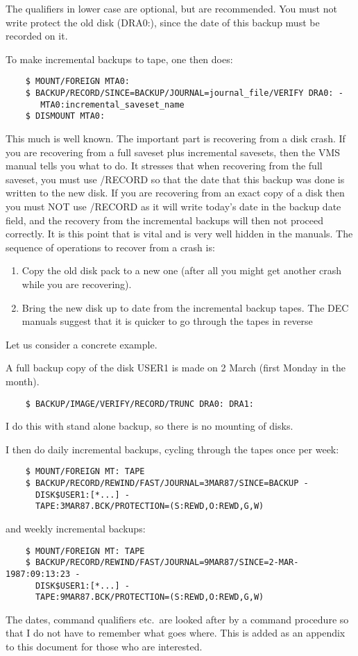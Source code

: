 The qualifiers in lower case are optional, but are recommended.
You must not write protect the old disk (DRA0:), since the date of this
backup must be recorded on it.

To make incremental backups to tape, one then does:
\begin{verbatim}
    $ MOUNT/FOREIGN MTA0: 
    $ BACKUP/RECORD/SINCE=BACKUP/JOURNAL=journal_file/VERIFY DRA0: -
       MTA0:incremental_saveset_name
    $ DISMOUNT MTA0:
\end{verbatim} 
This much is well known.
The important part is recovering from a disk crash.
If you are recovering from a full saveset plus incremental savesets, then
the VMS manual tells you what to do.
It stresses that when recovering from the full saveset, you must use /RECORD
so that the date that this backup was done is written to the new disk.
If you are recovering from an exact copy of a disk then you must NOT use
/RECORD as it will write today's date in the backup date field, and the 
recovery from the incremental backups will then not proceed correctly.
It is this point that is vital and is very well hidden in the manuals.
The sequence of operations to recover from a crash is:
\begin{enumerate}
\item Copy the old disk pack to a new one (after all you might get another
crash while you are recovering).
\item Bring the new disk up to date from the incremental backup tapes.
The DEC manuals suggest that it is quicker to go through the tapes in reverse
\end{enumerate}
Let us consider a concrete example.

A full backup copy of the disk USER1 is made on 2 March (first Monday in the
month). 
\begin{verbatim}
    $ BACKUP/IMAGE/VERIFY/RECORD/TRUNC DRA0: DRA1:
\end{verbatim}
I do this with stand alone backup, so there is no mounting of disks.

I then do daily incremental backups, cycling through the tapes once per week:
\begin{verbatim}
    $ MOUNT/FOREIGN MT: TAPE
    $ BACKUP/RECORD/REWIND/FAST/JOURNAL=3MAR87/SINCE=BACKUP -
      DISK$USER1:[*...] -
      TAPE:3MAR87.BCK/PROTECTION=(S:REWD,O:REWD,G,W)
\end{verbatim}
and weekly incremental backups:
\begin{verbatim}
    $ MOUNT/FOREIGN MT: TAPE
    $ BACKUP/RECORD/REWIND/FAST/JOURNAL=9MAR87/SINCE=2-MAR-1987:09:13:23 -
      DISK$USER1:[*...] -
      TAPE:9MAR87.BCK/PROTECTION=(S:REWD,O:REWD,G,W)
\end{verbatim}
The dates, command qualifiers etc.\ are looked after by a command procedure
so that I do not have to remember what goes where.
This is added as an appendix to this document for those who are interested.

